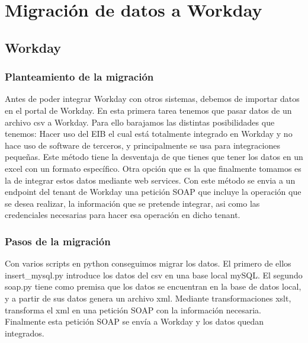 \chapter{Migración de datos a Workday}

\section{Workday}


\subsection{Planteamiento de la migración}

Antes de poder integrar Workday con otros sistemas, debemos de importar datos en el portal de Workday. En esta primera tarea tenemos que pasar datos de un archivo csv a Workday. Para ello barajamos las distintas posibilidades que tenemos:
Hacer uso del EIB el cual está totalmente integrado en Workday y no hace uso de software de terceros, y principalmente se usa para integraciones pequeñas. Este método tiene la desventaja de que tienes que tener los datos en un excel con un formato específico.
Otra opción que es la que finalmente tomamos es la de integrar estos datos mediante web services. Con este método se envia a un endpoint del tenant de Workday una petición SOAP que incluye la operación que se desea realizar, la información que se pretende integrar, asi como las credenciales necesarias para hacer esa operación en dicho tenant.
 

\subsection{Pasos de la migración}

Con varios scripts en python conseguimos migrar los datos.
El primero de ellos insert\_mysql.py introduce los datos del csv en una base local mySQL.
El segundo soap.py tiene como premisa que los datos se encuentran en la base de datos local, y a partir de sus datos genera un archivo xml.
Mediante transformaciones xslt, transforma el xml en una petición SOAP con la información necesaria.
Finalmente esta petición SOAP se envía a Workday y los datos quedan integrados.








